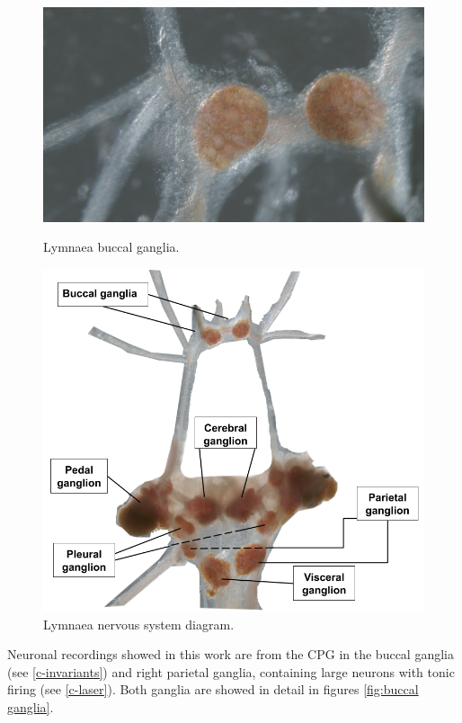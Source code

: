 \begin{figure}[h!]
	\centering
	\includegraphics[angle=180,width=0.9\linewidth]{img/methods/preparation/buccal_ganglia.JPG}
	\caption{Lymnaea buccal ganglia.}
	\label{fig:buccal ganglia}
	\endminipage
	\centering
	\includegraphics[width=\linewidth]{img/methods/CNS_diagram.png}
	\caption{Lymnaea nervous system diagram.}
	\label{fig:lymn neural sys diagram}
	\endminipage
\end{figure}

Neuronal recordings showed in this work are from the CPG in the buccal ganglia (see \ref{c-invariants}) and right parietal ganglia, containing large neurons with tonic firing (see \ref{c-laser}). Both ganglia are showed in detail in figures \ref{fig:buccal ganglia}.

